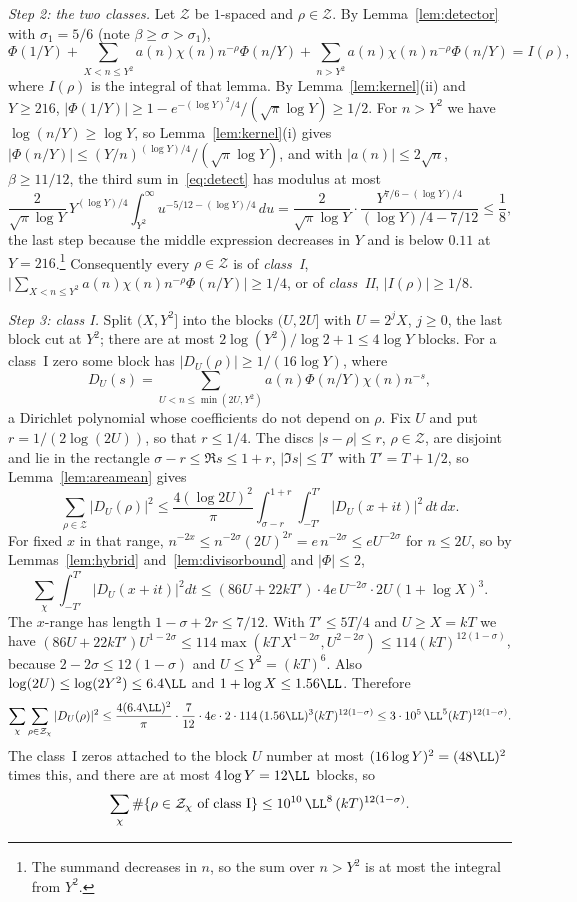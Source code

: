 \emph{Step 2: the two classes.} Let $\mathcal Z$ be $1$-spaced and $\rho\in\mathcal Z$. By Lemma~\ref{lem:detector} with $\sigma_1=5/6$ (note $\beta\ge\sigma>\sigma_1$),
\begin{equation}\label{eq:detect}
  \Phi(1/Y)+\sum_{X<n\le Y^2}a(n)\chi(n)n^{-\rho}\Phi(n/Y)+\sum_{n>Y^2}a(n)\chi(n)n^{-\rho}\Phi(n/Y)=I(\rho),
\end{equation}
where $I(\rho)$ is the integral of that lemma. By Lemma~\ref{lem:kernel}(ii) and $Y\ge216$, $|\Phi(1/Y)|\ge1-e^{-(\log Y)^2/4}/(\sqrt\pi\log Y)\ge1/2$. For $n>Y^2$ we have $\log(n/Y)\ge\log Y$, so Lemma~\ref{lem:kernel}(i) gives $|\Phi(n/Y)|\le(Y/n)^{(\log Y)/4}/(\sqrt\pi\log Y)$, and with $|a(n)|\le2\sqrt n$, $\beta\ge11/12$, the third sum in~\eqref{eq:detect} has modulus at most
\[
  \frac2{\sqrt\pi\log Y}\,Y^{(\log Y)/4}\int_{Y^2}^\infty u^{-5/12-(\log Y)/4}\,du
  =\frac2{\sqrt\pi\log Y}\cdot\frac{Y^{7/6-(\log Y)/4}}{(\log Y)/4-7/12}\le\frac18,
\]
the last step because the middle expression decreases in $Y$ and is below $0.11$ at $Y=216$.\footnote{The summand decreases in $n$, so the sum over $n>Y^2$ is at most the integral from $Y^2$.} Consequently every $\rho\in\mathcal Z$ is of \emph{class~I}, $\bigl|\sum_{X<n\le Y^2}a(n)\chi(n)n^{-\rho}\Phi(n/Y)\bigr|\ge1/4$, or of \emph{class~II}, $|I(\rho)|\ge1/8$.

\emph{Step 3: class I.} Split $(X,Y^2]$ into the blocks $(U,2U]$ with $U=2^jX$, $j\ge0$, the last block cut at $Y^2$; there are at most $2\log(Y^2)/\log2+1\le4\log Y$ blocks. For a class~I zero some block has $|D_U(\rho)|\ge1/(16\log Y)$, where
\[
  D_U(s)=\sum_{U<n\le\min(2U,Y^2)}a(n)\Phi(n/Y)\chi(n)n^{-s},
\]
a Dirichlet polynomial whose coefficients do not depend on $\rho$. Fix $U$ and put $r=1/(2\log(2U))$, so that $r\le1/4$. The discs $|s-\rho|\le r$, $\rho\in\mathcal Z$, are disjoint and lie in the rectangle $\sigma-r\le\Re s\le1+r$, $|\Im s|\le T'$ with $T'=T+1/2$, so Lemma~\ref{lem:areamean} gives
\[
  \sum_{\rho\in\mathcal Z}|D_U(\rho)|^2\le\frac{4(\log2U)^2}\pi\int_{\sigma-r}^{1+r}\int_{-T'}^{T'}|D_U(x+it)|^2\,dt\,dx .
\]
For fixed $x$ in that range, $n^{-2x}\le n^{-2\sigma}(2U)^{2r}=e\,n^{-2\sigma}\le eU^{-2\sigma}$ for $n\le2U$, so by Lemmas~\ref{lem:hybrid} and~\ref{lem:divisorbound} and $|\Phi|\le2$,
\[
  \sum_\chi\int_{-T'}^{T'}|D_U(x+it)|^2dt\le(86U+22kT')\cdot4e\,U^{-2\sigma}\cdot2U(1+\log X)^3 .
\]
The $x$-range has length $1-\sigma+2r\le7/12$. With $T'\le5T/4$ and $U\ge X=kT$ we have $(86U+22kT')U^{1-2\sigma}\le114\max(kT\,X^{1-2\sigma},U^{2-2\sigma})\le114(kT)^{12(1-\sigma)}$, because $2-2\sigma\le12(1-\sigma)$ and $U\le Y^2=(kT)^6$. Also $\log(2U)\le\log(2Y^2)\le6.4\LL$ and $1+\log X\le1.56\LL$. Therefore
\[
  \sum_\chi\sum_{\rho\in\mathcal Z_\chi}|D_U(\rho)|^2\le\frac{4(6.4\LL)^2}\pi\cdot\frac7{12}\cdot4e\cdot2\cdot114\,(1.56\LL)^3(kT)^{12(1-\sigma)}\le3\cdot10^5\,\LL^5(kT)^{12(1-\sigma)}.
\]
The class~I zeros attached to the block $U$ number at most $(16\log Y)^2=(48\LL)^2$ times this, and there are at most $4\log Y=12\LL$ blocks, so
\begin{equation}\label{eq:classI}
  \sum_\chi\#\{\rho\in\mathcal Z_\chi\text{ of class I}\}\le10^{10}\,\LL^8\,(kT)^{12(1-\sigma)} .
\end{equation}

